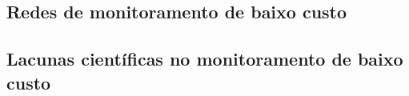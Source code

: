 \subsection{Redes de monitoramento de baixo custo}

\subsection{Lacunas científicas no monitoramento de baixo custo}
